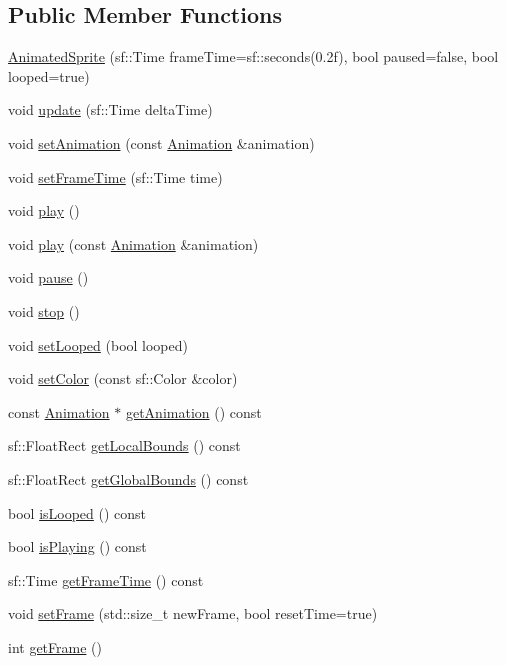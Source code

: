 \subsection*{Public Member Functions}
\begin{DoxyCompactItemize}
\item 
\hyperlink{class_animated_sprite_a097ab8444824e7085d71a1f7144e7763}{Animated\+Sprite} (sf\+::\+Time frame\+Time=sf\+::seconds(0.\+2f), bool paused=false, bool looped=true)
\item 
void \hyperlink{class_animated_sprite_a17a41ff812631a9d8947d272933d6696}{update} (sf\+::\+Time delta\+Time)
\item 
void \hyperlink{class_animated_sprite_ab1afc57d90d57a0c4bc4f5b090f2dacf}{set\+Animation} (const \hyperlink{class_animation}{Animation} \&animation)
\item 
void \hyperlink{class_animated_sprite_af598fab5c3599ccc5ed1e2d4fefa68cc}{set\+Frame\+Time} (sf\+::\+Time time)
\item 
void \hyperlink{class_animated_sprite_a203b968f1cb374cca5dbc89716174020}{play} ()
\item 
void \hyperlink{class_animated_sprite_a9ea345649a4e012d096bc04aafe1ecb0}{play} (const \hyperlink{class_animation}{Animation} \&animation)
\item 
void \hyperlink{class_animated_sprite_a48384db59427423b5c1d98f6ee94fe45}{pause} ()
\item 
void \hyperlink{class_animated_sprite_af9734f4346d3d2370322b2dcaeef133c}{stop} ()
\item 
void \hyperlink{class_animated_sprite_a855a5a48ea2e1c51c7c9304857dd2f8c}{set\+Looped} (bool looped)
\item 
void \hyperlink{class_animated_sprite_a1a96a0f6570efddd2eb26f89bc5b6f50}{set\+Color} (const sf\+::\+Color \&color)
\item 
const \hyperlink{class_animation}{Animation} $\ast$ \hyperlink{class_animated_sprite_a03bacdbaf638cb6f7987e342980206c2}{get\+Animation} () const
\item 
sf\+::\+Float\+Rect \hyperlink{class_animated_sprite_ac4c88435c8698f452629c5cd78bfb3c9}{get\+Local\+Bounds} () const
\item 
sf\+::\+Float\+Rect \hyperlink{class_animated_sprite_a86dca0906c53b3e630aaeac2f0085a0e}{get\+Global\+Bounds} () const
\item 
bool \hyperlink{class_animated_sprite_aaf2c2fb0e1487e689af4a6bbeb7e3e85}{is\+Looped} () const
\item 
bool \hyperlink{class_animated_sprite_a55f450add05d45e5369a6ad24f9e438f}{is\+Playing} () const
\item 
sf\+::\+Time \hyperlink{class_animated_sprite_a5291f8e24fe2c6e4284bc7ff9499ef77}{get\+Frame\+Time} () const
\item 
void \hyperlink{class_animated_sprite_a0b3e38fffdc1d29f46fa08df9ef2a747}{set\+Frame} (std\+::size\+\_\+t new\+Frame, bool reset\+Time=true)
\item 
int \hyperlink{class_animated_sprite_a8e929c48b0ca713b7aac7dd769e4f00c}{get\+Frame} ()
\end{DoxyCompactItemize}



